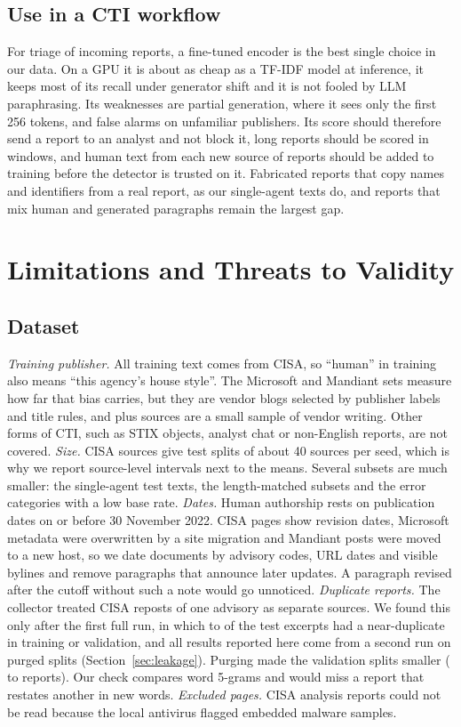 \documentclass[journal]{IEEEtran}
\begin{document}
\subsection{Use in a CTI workflow}
For triage of incoming reports, a fine-tuned encoder is the best single choice in our data. On a GPU it is about as
cheap as a TF-IDF model at inference, it keeps most of its recall under generator shift and it is not fooled by
LLM paraphrasing. Its weaknesses are partial generation, where it sees only the first 256 tokens, and false alarms
on unfamiliar publishers. Its score should therefore send a report to an analyst and not block it, long reports
should be scored in windows, and human text from each new source of reports should be added to training before the
detector is trusted on it. Fabricated reports that copy names and identifiers from a real report, as our
single-agent texts do, and reports that mix human and generated paragraphs remain the largest gap.

\section{Limitations and Threats to Validity}\label{sec:limits}
\subsection{Dataset}
\emph{Training publisher.} All training text comes from CISA, so ``human'' in training also means ``this agency's
house style''. The Microsoft and Mandiant sets measure how far that bias carries, but they are vendor blogs
selected by publisher labels and title rules, and \NExtSourcesMicrosoft{} plus \NExtSourcesMandiant{} sources are a
small sample of vendor writing. Other forms of CTI, such as STIX objects, analyst chat or non-English reports, are
not covered. \emph{Size.} \NSources{} CISA sources give test splits of about 40 sources per seed, which is why we
report source-level intervals next to the means. Several subsets are much smaller: the single-agent test texts,
the length-matched subsets and the error categories with a low base rate. \emph{Dates.} Human authorship rests on
publication dates on or before 30 November 2022. CISA pages show revision dates, Microsoft metadata were
overwritten by a site migration and Mandiant posts were moved to a new host, so we date documents by advisory
codes, URL dates and visible bylines and remove paragraphs that announce later updates. A paragraph revised after
the cutoff without such a note would go unnoticed. \emph{Duplicate reports.} The collector treated CISA reposts
of one advisory as separate sources. We found this only after the first full run, in which \LeakPlainDupShareMin{}
to \LeakPlainDupShareMax{} of the test excerpts had a near-duplicate in training or validation, and all results
reported here come from a second run on purged splits (Section~\ref{sec:leakage}). Purging made the validation
splits smaller (\LeakValMin{} to \LeakValMax{} reports). Our check compares word 5-grams and would miss a report that
restates another in new words. \emph{Excluded pages.} \NBlocked{} CISA analysis reports could
not be read because the local antivirus flagged embedded malware samples.
\end{document}
